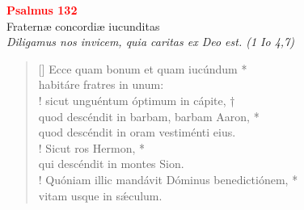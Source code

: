 


\def\greinitialformat#1{%
{\fontsize{39}{39}\selectfont #1}%
}




\vspace{0.3cm}
\begin{center}
 \textcolor{red}{\large \bf Psalmus 132}\\
Fraternæ concordiæ iucunditas\\
\textit{\small Diligamus nos invicem, quia caritas ex Deo est. (1 Io 4,7)}
\end{center}
\begin{verse}[\versewidth]
Ecce quam bonum et quam iucúndum *\\
habitáre fratres in unum:\\!
\vin sicut unguéntum óptimum in cápite, †\\
\vin quod descéndit in barbam, barbam Aaron, *\\
\vin quod descéndit in oram vestiménti eius.\\!
Sicut ros Hermon, *\\
qui descéndit in montes Sion.\\!
\vin Quóniam illic mandávit Dóminus benedictiónem, *\\
\vin vitam usque in s\'{æ}culum.\\
\end{verse}
\vspace{1cm}


